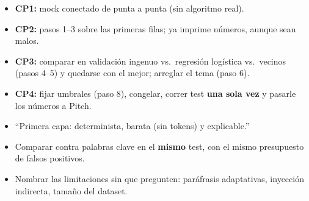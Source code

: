 \begin{minipage}[t]{0.55\linewidth}
\colsetup
{}
\begin{itemize}
  \item \textbf{CP1:} mock conectado de punta a punta (sin algoritmo real).
  \item \textbf{CP2:} pasos 1–3 sobre las primeras filas;  ya imprime números, aunque sean malos.
  \item \textbf{CP3:} comparar en validación ingenuo vs.\ regresión logística vs.\ vecinos (pasos 4–5) y quedarse con el mejor; arreglar el tema (paso 6).
  \item \textbf{CP4:} fijar umbrales (paso 8), congelar, correr test \textbf{una sola vez} y pasarle los números a Pitch.
\end{itemize}
\end{minipage}\hfill
\begin{minipage}[t]{0.42\linewidth}
\colsetup
{}
\begin{itemize}
  \item “Primera capa: determinista, barata (sin tokens) y explicable.”
  \item Comparar contra palabras clave en el \textbf{mismo} test, con el mismo presupuesto de falsos positivos.
  \item Nombrar las limitaciones sin que pregunten: paráfrasis adaptativas, inyección indirecta, tamaño del dataset.
\end{itemize}
\end{minipage}
